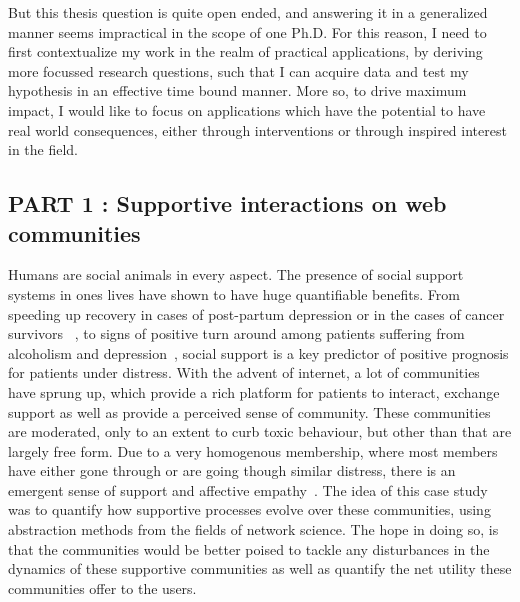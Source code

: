 \vspace{0.5cm}
\noindent{}
\vspace{0.5cm} 

But this thesis question is quite open ended, and answering it in a generalized manner seems impractical in the scope of one Ph.D. For this reason, I need to first contextualize my work in the realm  of practical applications, by deriving more focussed research questions, such that I can acquire data and test my hypothesis in an effective time bound manner. More so, to drive maximum impact, I would like to focus on applications which have the potential to have real world consequences, either through interventions or through inspired interest in the field.

\subsection{PART 1 : Supportive interactions on web communities}
Humans are social animals in every aspect. The presence of social support systems in ones lives have shown to have huge quantifiable benefits. From speeding up recovery in cases of post-partum depression or in the cases of cancer survivors~\cite{collins1993social,dunkel1984social,baron1990social} , to signs of positive turn around among patients suffering from alcoholism and depression~\cite{peirce2000longitudinal,brown1986social}, social support is a key predictor of positive prognosis for patients under distress. With the advent of internet, a lot of communities have sprung up, which provide a rich platform for patients to interact, exchange support as well as provide a perceived sense of community. These communities are moderated, only to an extent to curb toxic behaviour, but other than that are largely free form. Due to a very homogenous membership, where most members have either gone through or are going though similar distress, there is an emergent sense of support and affective empathy~\cite{de2016stroke}. The idea of this case study was to quantify how supportive processes evolve over these communities, using abstraction methods from the fields of network science. The hope in doing so, is that the communities would be better poised to tackle any disturbances in the dynamics of these supportive communities as well as quantify the net utility these communities offer to the users. 

